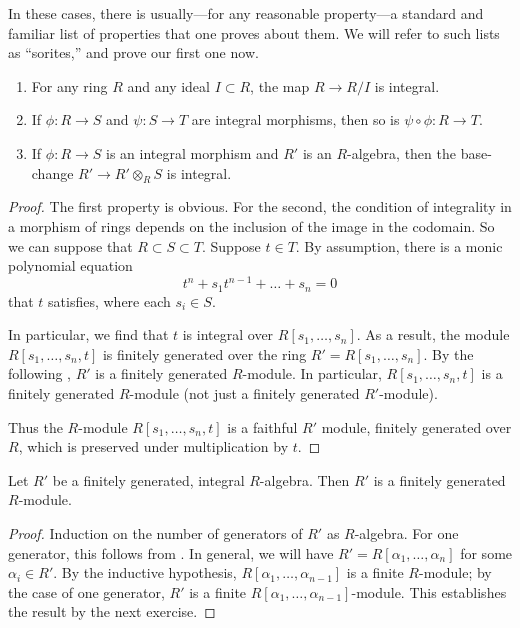 In these cases, there is usually---for any reasonable property---a standard
and familiar list of
properties that one proves about them. We will refer to such lists as
``sorites,'' and prove our first one now.

\begin{proposition}
\begin{enumerate}
\item For any ring $R$ and any ideal $I \subset R$, the map $R \to R/I$ is
integral.
\item If $\phi: R \to S$ and $\psi: S \to T$ are integral morphisms, then so
is $\psi \circ \phi: R \to T$.
\item If $\phi: R \to S$ is an integral morphism and $R'$ is an $R$-algebra,
then the base-change
$R' \to R' \otimes_R S$ is integral.
\end{enumerate}
\end{proposition}

\begin{proof}
The first property is obvious. For the second, the condition of
integrality in a morphism of rings depends on the inclusion of the image
in the codomain. So we can suppose that $R \subset S \subset T$. Suppose $t
\in T$. By assumption, there is a monic polynomial equation
\[ t^n + s_1 t^{n-1} + \dots + s_n = 0  \]
that $t$ satisfies, where each $s_i \in S$.

In particular, we find that $t$ is integral over $R[s_1, \dots, s_n]$.
As a result, the module $R[s_1, \dots, s_n, t]$ is finitely generated over the
ring $R'=R[s_1, \dots, s_n]$.
By the following , $R'$ is a finitely generated
$R$-module. In
particular, $R[s_1, \dots, s_n,t]$ is a finitely generated $R$-module (not
just a
finitely generated $R'$-module).

Thus the $R$-module $R[s_1, \dots, s_n,t]$  is a faithful
$R'$ module, finitely generated over $R$, which is preserved under
multiplication by $t$.
\end{proof}

\begin{lemma} \label{finitelygeneratedintegral}
Let $R'$ be a finitely generated, integral $R$-algebra. Then $R'$ is a
finitely generated $R$-module.
\end{lemma}
\begin{proof}
Induction on the number of generators of $R'$ as $R$-algebra. For one
generator, this follows from .
In general, we will have $R' = R[\alpha_1 ,\dots, \alpha_n]$ for some
$\alpha_i \in R'$.
By the inductive hypothesis, $R[\alpha_1 , \dots, \alpha_{n-1}]$ is a finite
$R$-module; by the case of one generator, $R'$ is a finite $R[\alpha_1, \dots,
\alpha_{n-1}]$-module. This establishes the result by the next exercise.
\end{proof}

